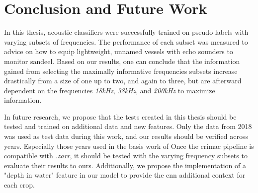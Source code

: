 \chapter{Conclusion and Future Work}
    In this thesis, acoustic classifiers were successfully trained on pseudo labels with varying subsets of frequencies. The performance of each subset was measured to advice on how to equip lightweight, unnamed vessels with echo sounders to monitor sandeel. Based on our results, one can conclude that the information gained from selecting the maximally informative frequencies subsets increase drastically from a size of one up to two, and again to three, but are afterward dependent on the frequencies \textit{18kHz}, \textit{38kHz}, and \textit{200kHz} to maximize information.
    
    
    

    
    In future research, we propose that the tests created in this thesis should be tested and trained on additional data and new features. Only the data from 2018 was used as test data during this work, and our results should be verified across years. Especially those years used in the basis work of \citeauthor{brautaset2020acoustic} Once the \gls{crimac} pipeline is compatible with \textit{.zarr}, it should be tested with the varying frequency subsets to evaluate their results to ours. Additionally, we propose the implementation of a "depth in water" feature in our model to provide the \gls{cnn} additional context for each crop.
    
